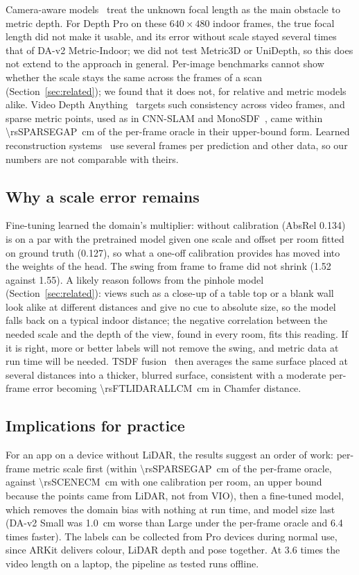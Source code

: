 Camera-aware models~\cite{metric3d,unidepth,depthpro} treat the unknown focal length as the main obstacle to metric
depth. For Depth Pro on these $640\times480$ indoor frames, the true focal length did not make it usable, and its error
without scale stayed several times that of \mbox{DA-v2} Metric-Indoor; we did not test Metric3D or UniDepth, so this
does not extend to the approach in general. Per-image benchmarks cannot show whether the scale stays the same across
the frames of a scan (Section~\ref{sec:related}); we found that it does not, for relative and metric models alike.
Video Depth Anything~\cite{videoda} targets such consistency across video frames, and sparse metric points, used as in
CNN-SLAM and MonoSDF~\cite{cnnslam,monosdf}, came within \SI{\rsSPARSEGAP}{cm} of the per-frame oracle in their
upper-bound form. Learned reconstruction systems~\cite{atlas,neuralrecon,simplerecon} use several frames per prediction
and other data, so our numbers are not comparable with theirs.

\subsection{Why a scale error remains}\label{sec:whyft}
Fine-tuning learned the domain's multiplier: \ftmain{} without calibration (AbsRel 0.134) is on a par with the
pretrained model given one scale and offset per room fitted on ground truth (0.127), so what a one-off calibration
provides has moved into the weights of the head. The swing from frame to frame did not shrink (1.52 against 1.55). A
likely reason follows from the pinhole model (Section~\ref{sec:related}): views such as a close-up of a table top or a
blank wall look alike at different distances and give no cue to absolute size, so the model falls back on a typical
indoor distance; the negative correlation between the needed scale and the depth of the view, found in every room, fits
this reading. If it is right, more or better labels will not remove the swing, and metric data at run time will be
needed. TSDF fusion~\cite{curless96} then averages the same surface placed at several distances into a thicker, blurred
surface, consistent with a moderate per-frame error becoming \SI{\rsFTLIDARALLCM}{cm} in Chamfer distance.

\subsection{Implications for practice}\label{sec:business}
For an app on a device without LiDAR, the results suggest an order of work: per-frame metric scale first (within
\SI{\rsSPARSEGAP}{cm} of the per-frame oracle, against \SI{\rsSCENECM}{cm} with one calibration per room, an upper bound
because the points came from LiDAR, not from VIO), then a fine-tuned model, which removes the domain bias with nothing at
run time, and model size last (\mbox{DA-v2} Small was \SI{1.0}{cm} worse than Large under the per-frame oracle and 6.4
times faster). The labels can be collected from Pro devices during normal use, since ARKit delivers colour, LiDAR depth
and pose together. At 3.6 times the video length on a laptop, the pipeline as tested runs offline.

